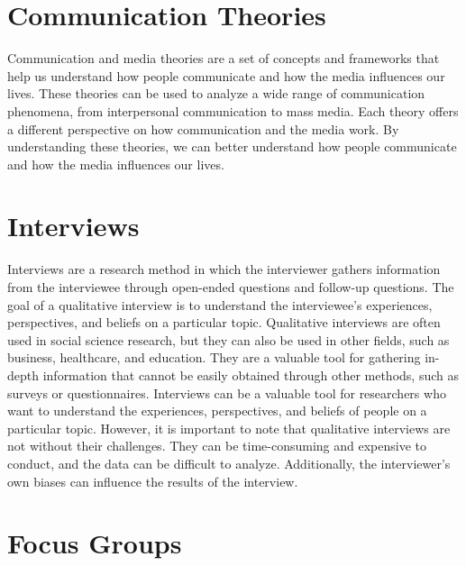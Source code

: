 \documentclass[
  b5paper]{book}
\begin{document}
\hypertarget{communication-theories}{%
\section*{Communication Theories}\label{communication-theories}}

Communication and media theories are a set of concepts and frameworks that help us understand how people communicate and how the media influences our lives. These theories can be used to analyze a wide range of communication phenomena, from interpersonal communication to mass media. Each theory offers a different perspective on how communication and the media work. By understanding these theories, we can better understand how people communicate and how the media influences our lives.

\hypertarget{interviews}{%
\section*{Interviews}\label{interviews}}

Interviews are a research method in which the interviewer gathers information from the interviewee through open-ended questions and follow-up questions. The goal of a qualitative interview is to understand the interviewee's experiences, perspectives, and beliefs on a particular topic. Qualitative interviews are often used in social science research, but they can also be used in other fields, such as business, healthcare, and education. They are a valuable tool for gathering in-depth information that cannot be easily obtained through other methods, such as surveys or questionnaires. Interviews can be a valuable tool for researchers who want to understand the experiences, perspectives, and beliefs of people on a particular topic. However, it is important to note that qualitative interviews are not without their challenges. They can be time-consuming and expensive to conduct, and the data can be difficult to analyze. Additionally, the interviewer's own biases can influence the results of the interview.

\hypertarget{focus-groups}{%
\section*{Focus Groups}\label{focus-groups}}
\end{document}
